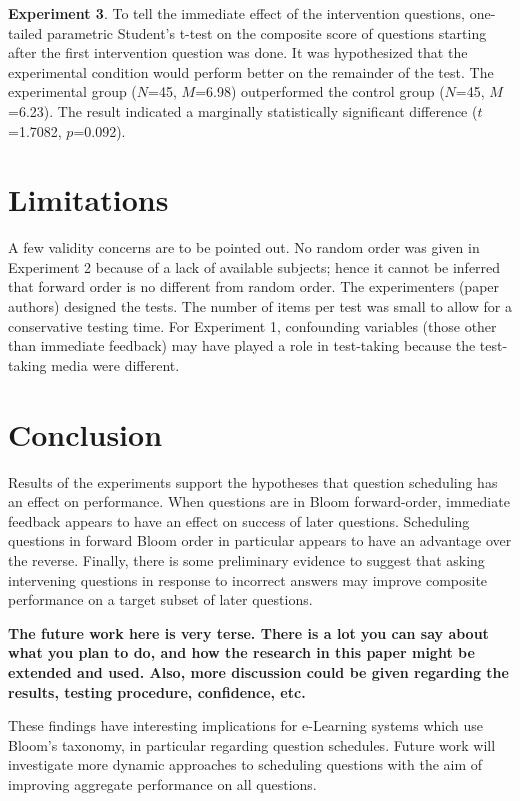 \documentclass[a4paper,twocolumn]{article}
\begin{document}
\textbf{Experiment 3}. To tell the immediate effect of the intervention
questions, one-tailed parametric Student's t-test on the composite score of
questions starting after the first intervention question was done. It was
hypothesized that the experimental condition would perform better on the
remainder of the test. The experimental group ($N$=45, $M$=6.98) outperformed
the control group ($N$=45, $M$=6.23).  The result indicated a marginally
statistically significant difference ($t$=1.7082, $p$=0.092).

\section{Limitations}

A few validity concerns are to be pointed out. No random order was given in
Experiment 2 because of a lack of available subjects; hence it cannot be
inferred that forward order is no different from random order. The
experimenters (paper authors) designed the tests. The number of items per test
was small to allow for a conservative testing time.  For Experiment 1,
confounding variables (those other than immediate feedback) may have played a
role in test-taking because the test-taking media were different.

\section{Conclusion}

Results of the experiments support the hypotheses that question scheduling has
an effect on performance. When questions are in Bloom forward-order, immediate
feedback appears to have an effect on success of later questions. Scheduling
questions in forward Bloom order in particular appears to have an advantage
over the reverse.  Finally, there is some preliminary evidence to suggest that
asking intervening questions in response to incorrect answers may improve
composite performance on a target subset of later questions.

{\bf The future work here is very terse. There is a lot you can say about
what you plan to do, and how the research in this paper might be
extended and used. Also, more discussion could be given regarding the results,
testing procedure, confidence, etc.}

These findings have interesting implications for e-Learning systems which use
Bloom's taxonomy, in particular regarding question schedules. Future work will
investigate more dynamic approaches to scheduling questions with the aim of
improving aggregate performance on all questions.



\end{document}
